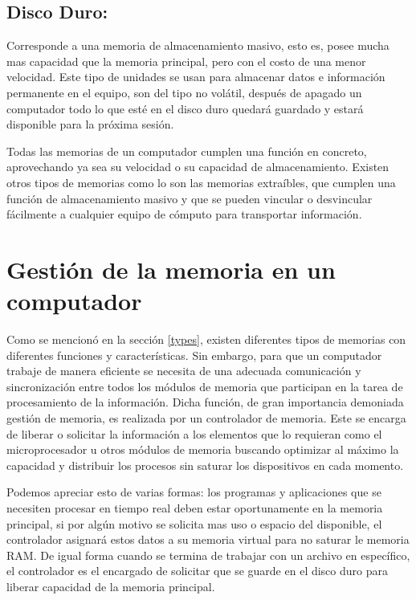 \documentclass{article}
\begin{document}
\subsection{Disco Duro: }
Corresponde a una memoria de almacenamiento masivo, esto es, posee mucha mas capacidad que la memoria principal, pero con el costo de una menor velocidad. Este tipo de unidades se usan para almacenar datos e información permanente en el equipo, son del tipo no volátil, después de apagado un computador todo lo que esté en el disco duro quedará guardado y estará disponible para la próxima sesión. 

Todas las memorias de un computador cumplen una función en concreto, aprovechando ya sea su velocidad o su capacidad de almacenamiento. Existen otros tipos de memorias como lo son las memorias extraíbles, que cumplen una función de almacenamiento masivo y que se pueden vincular o desvincular fácilmente a cualquier equipo de cómputo para transportar información.

\section{Gestión de la memoria en un computador} \label{working}

Como se mencionó en la sección \ref{types}, existen diferentes tipos de memorias con diferentes funciones y características. Sin embargo, para que un computador trabaje de manera eficiente se necesita de una adecuada comunicación y sincronización entre todos los módulos de memoria que participan en la tarea de procesamiento de la información. Dicha función, de gran importancia demoniada gestión de memoria, es realizada por un controlador de memoria. Este se encarga de liberar o solicitar la información a los elementos que lo requieran como el microprocesador u otros módulos de memoria buscando optimizar al máximo la capacidad y distribuir los procesos sin saturar los dispositivos en cada momento. 

Podemos apreciar esto de varias formas: los programas y aplicaciones que se necesiten procesar en tiempo real deben estar oportunamente en la memoria principal, si por algún motivo se solicita mas uso o espacio del disponible, el controlador asignará estos datos a su memoria virtual para no saturar le memoria RAM. De igual forma cuando se termina de trabajar con un archivo en específico, el controlador es el encargado de solicitar que se guarde en el disco duro para liberar capacidad de la memoria principal. \cite{gestion}
\end{document}
